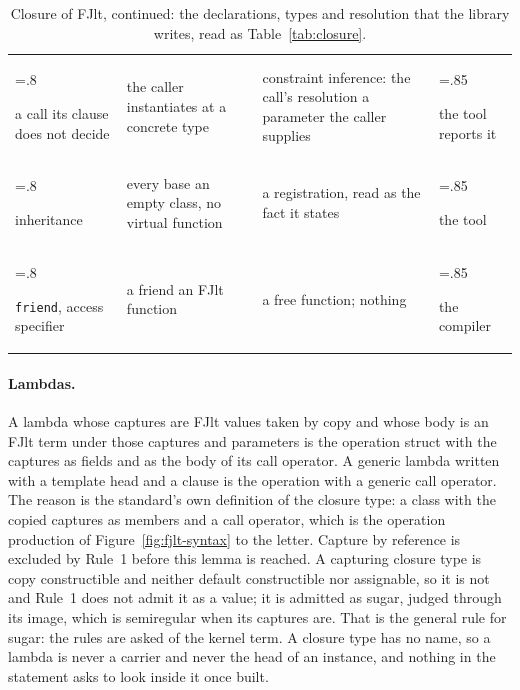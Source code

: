 \begin{table}[tbp]
\begin{tabularx}{\linewidth}{@{}>{\hsize=.8\hsize\raggedright\arraybackslash}X>{\hsize=1.2\hsize\raggedright\arraybackslash}X>{\hsize=1.15\hsize\raggedright\arraybackslash}X>{\hsize=.85\hsize\raggedright\arraybackslash}X@{}}
a call its clause does not decide & the caller instantiates at a concrete type & constraint inference: the call's resolution a parameter the caller supplies & the tool reports it \\
inheritance & every base an empty class, no virtual function & a registration, read as the fact it states & the tool \\
\texttt{friend}, access specifier & a friend an FJlt function & a free function; nothing & the compiler \\
\bottomrule
\end{tabularx}
\caption{Closure of FJlt, continued: the declarations, types and resolution that the library writes, read as Table~\ref{tab:closure}.}
\label{tab:closure:decl}
\end{table}

\paragraph{Lambdas.}
A lambda  whose captures are FJlt values taken by copy and whose body is an FJlt term under those captures and parameters is the operation struct with the captures as fields and  as the body of its call operator.
A generic lambda written with a template head and a  clause is the operation with a generic call operator.
The reason is the standard's own definition of the closure type: a class with the copied captures as members and a  call operator, which is the operation production of Figure~\ref{fig:fjlt-syntax} to the letter.
Capture by reference is excluded by Rule~1 before this lemma is reached.
A capturing closure type is copy constructible and neither default constructible nor assignable, so it is not  and Rule~1 does not admit it as a value; it is admitted as sugar, judged through its image, which is semiregular when its captures are.
That is the general rule for sugar: the rules are asked of the kernel term.
A closure type has no name, so a lambda is never a carrier and never the head of an instance, and nothing in the statement asks to look inside it once built.

